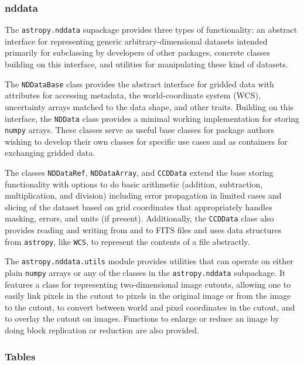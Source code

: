 \documentclass[modern]{aastex61}
\newcommand{\package}[1]{\texttt{#1}\xspace}
\newcommand{\astropypkg}{\package{astropy}}
\begin{document}
\subsubsection{nddata}

The \package{astropy.nddata} supackage provides three types of functionality: an
abstract interface for representing generic arbitrary-dimensional datasets
intended primarily for subclassing by developers of other packages, concrete
classes building on this interface, and utilities for manipulating these kind of
datasets.

The \texttt{NDDataBase} class provides the abstract interface for gridded data
with attributes for accessing metadata, the world-coordinate system (WCS),
uncertainty arrays matched to the data shape, and other traits.
Building on this interface, the \texttt{NDData} class provides a minimal working implementation for storing \package{numpy} arrays. These classes serve as useful base classes for package authors wishing to develop their own classes for specific use cases and as containers for exchanging gridded data.

The classes \texttt{NDDataRef}, \texttt{NDDataArray}, and \texttt{CCDData} extend the base storing functionality with options to do basic arithmetic (addition, subtraction, multiplication, and division) including error propagation in limited cases and slicing of the dataset based on grid coordinates that appropriately handles masking, errors, and units (if present). Additionally, the \texttt{CCDData} class also provides reading and writing from and to FITS files and uses data structures from \astropypkg, like \texttt{WCS}, to represent the contents of a file abstractly.

The \package{astropy.nddata.utils} module provides utilities that can operate on either plain \package{numpy} arrays or any of the classes in the \package{astropy.nddata} subpackage. It features a class for representing two-dimensional image cutouts, allowing one to easily link pixels in the cutout to pixels in the original image or from the image to the cutout, to convert between world and pixel coordinates in the cutout, and to overlay the cutout on images. Functions to enlarge or reduce an image by doing block replication or reduction are also provided.

\subsubsection{Tables}
\label{sec:table}
\end{document}
